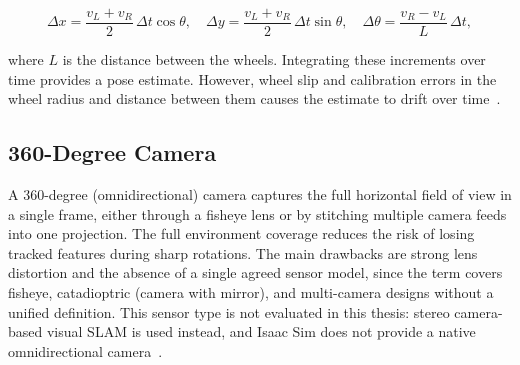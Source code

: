 \begin{equation}
  \Delta x = \frac{v_L + v_R}{2}\,\Delta t\cos\theta, \quad
  \Delta y = \frac{v_L + v_R}{2}\,\Delta t\sin\theta, \quad
  \Delta\theta = \frac{v_R - v_L}{L}\,\Delta t,
  \label{eq:wheel_odom}
\end{equation}

\noindent where $L$ is the distance between the wheels.
Integrating these increments over time provides a pose estimate.
However, wheel slip and calibration errors in the wheel
radius and distance between them causes the estimate to drift over time~\cite[Ch.~3]{siegwart2004introduction}.

%
%

\subsection{360-Degree Camera}

A 360-degree (omnidirectional) camera captures the full horizontal field of
view in a single frame, either through a fisheye lens or by stitching multiple
camera feeds into one projection.
The full environment coverage reduces the risk of losing tracked features during sharp
rotations.
The main drawbacks are strong lens distortion and the absence of a single
agreed sensor model, since the term covers fisheye, catadioptric (camera with mirror), and
multi-camera designs without a unified definition.
This sensor type is not evaluated in this thesis: stereo camera-based visual
SLAM is used instead, and Isaac Sim does not provide a native omnidirectional
camera~\cite[Ch.~4]{siegwart2004introduction}.

